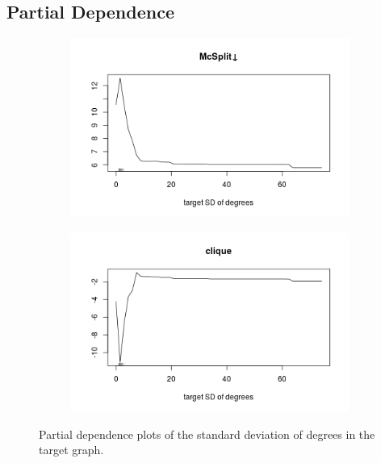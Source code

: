 \documentclass{l4proj}
\theoremstyle{definition}
\theoremstyle{remark}
\begin{document}
\subsection{Partial Dependence} \label{sec:unlabelled_partial}

\begin{figure}
  \centering
  \begin{subfigure}[t]{0.49\textwidth}
    \centering
    \includegraphics[width=\textwidth]{images/mcsplit_partial.png}
  \end{subfigure}
  \begin{subfigure}[t]{0.49\textwidth}
    \centering
    \includegraphics[width=\textwidth]{images/clique_partial.png}
  \end{subfigure}
  \caption{Partial dependence plots of the standard deviation of degrees in the
    target graph.}
  \label{fig:unlabelled_partials}
\end{figure}
\end{document}
